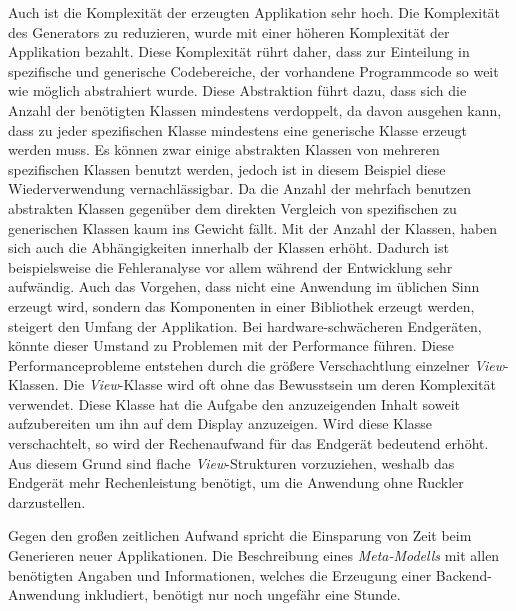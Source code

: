 Auch ist die Komplexität der erzeugten Applikation sehr hoch. Die Komplexität des Generators zu reduzieren, wurde mit einer höheren Komplexität der Applikation bezahlt. Diese Komplexität rührt daher, dass zur Einteilung in spezifische und generische Codebereiche, der vorhandene Programmcode so weit wie möglich abstrahiert wurde. Diese Abstraktion führt dazu, dass sich die Anzahl der benötigten Klassen mindestens verdoppelt, da davon ausgehen kann, dass zu jeder spezifischen Klasse mindestens eine generische Klasse erzeugt werden muss. Es können zwar einige abstrakten Klassen von mehreren spezifischen Klassen benutzt werden, jedoch ist in diesem Beispiel diese Wiederverwendung vernachlässigbar. Da die Anzahl der mehrfach benutzen abstrakten Klassen gegenüber dem direkten Vergleich von spezifischen zu generischen Klassen kaum ins Gewicht fällt. Mit der Anzahl der Klassen, haben sich auch die Abhängigkeiten innerhalb der Klassen erhöht. Dadurch ist beispielsweise die Fehleranalyse vor allem während der Entwicklung sehr aufwändig. Auch das Vorgehen, dass nicht eine Anwendung im üblichen Sinn erzeugt wird, sondern das Komponenten in einer Bibliothek erzeugt werden, steigert den Umfang der Applikation. Bei hardware-schwächeren Endgeräten, könnte dieser Umstand zu Problemen mit der Performance führen. Diese Performanceprobleme entstehen durch die größere Verschachtlung einzelner \textit{View}-Klassen. Die \textit{View}-Klasse wird oft ohne das Bewusstsein um deren Komplexität verwendet. Diese Klasse hat die Aufgabe den anzuzeigenden Inhalt soweit aufzubereiten um ihn auf dem Display anzuzeigen. Wird diese Klasse verschachtelt, so wird der Rechenaufwand für das Endgerät bedeutend erhöht. Aus diesem Grund sind flache \textit{View}-Strukturen vorzuziehen, weshalb das Endgerät mehr Rechenleistung benötigt, um die Anwendung ohne Ruckler darzustellen.

Gegen den großen zeitlichen Aufwand spricht die Einsparung von Zeit beim Generieren neuer Applikationen. Die Beschreibung eines \textit{Meta-Modells} mit allen benötigten Angaben und Informationen, welches die Erzeugung einer Backend-Anwendung inkludiert, benötigt nur noch ungefähr eine Stunde. 